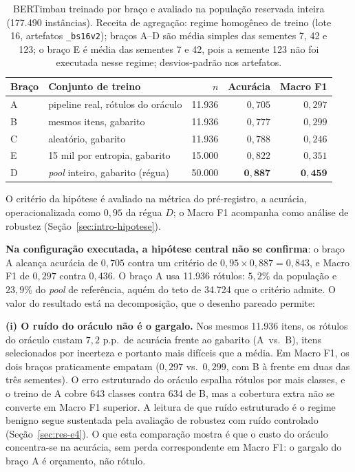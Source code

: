 \begin{table}[htb]
\centering
\caption{BERTimbau treinado por braço e avaliado na população
reservada inteira (177.490 instâncias). Receita de agregação: regime
homogêneo de treino (lote 16, artefatos \texttt{\_bs16v2}); braços A--D são média simples das sementes 7,
42 e 123; o braço E é média das sementes 7 e 42, pois a semente 123 não
foi executada nesse regime; desvios-padrão nos artefatos.}
\label{tab:e3p}
\small
\begin{tabular}{l l r r r}
\toprule
\textbf{Braço} & \textbf{Conjunto de treino} & $n$ & \textbf{Acurácia} & \textbf{Macro F1} \\
\midrule
A & pipeline real, rótulos do oráculo & 11.936 & $0{,}705$ & $0{,}297$ \\
B & mesmos itens, gabarito & 11.936 & $0{,}777$ & $0{,}299$ \\
C & aleatório, gabarito & 11.936 & $0{,}788$ & $0{,}246$ \\
E & 15 mil por entropia, gabarito & 15.000 & $0{,}822$ & $0{,}351$ \\
D & \emph{pool} inteiro, gabarito (régua) & 50.000 & $\mathbf{0{,}887}$ & $\mathbf{0{,}459}$ \\
\bottomrule
\end{tabular}
\end{table}

O critério da hipótese é avaliado na métrica do pré-registro, a acurácia,
operacionalizada como $0{,}95$ da régua $D$; o Macro F1 acompanha como
análise de robustez (Seção~\ref{sec:intro-hipotese}).

\textbf{Na configuração executada, a hipótese central não se confirma}: o
braço A alcança acurácia de $0{,}705$ contra um critério de
$0{,}95 \times 0{,}887 = 0{,}843$, e Macro F1 de $0{,}297$ contra
$0{,}436$. O braço A usa 11.936 rótulos: $5{,}2\%$ da população e
$23{,}9\%$ do \textit{pool} de referência, aquém do teto de 34.724 que o
critério admite. O valor do resultado está na decomposição, que o desenho
pareado permite:

\textbf{(i) O ruído do oráculo não é o gargalo.} Nos mesmos 11.936 itens,
os rótulos do oráculo custam $7{,}2$ p.p.\ de acurácia frente ao gabarito
(A~vs.~B), itens selecionados por incerteza e portanto mais difíceis que
a média. Em Macro F1, os dois braços praticamente empatam ($0{,}297$ vs.\ $0{,}299$,
com B à frente em duas das três sementes). O erro estruturado do oráculo
espalha rótulos por mais classes, e o treino de A cobre 643 classes contra 634
de B, mas a cobertura extra não se converte em Macro F1 superior. A leitura de que ruído estruturado é o regime benigno segue sustentada pela
avaliação de robustez com ruído controlado (Seção~\ref{sec:res-e4}). O que esta
comparação mostra é que o custo do oráculo concentra-se na acurácia, sem perda
correspondente em Macro F1: o gargalo do braço A é orçamento, não rótulo.

